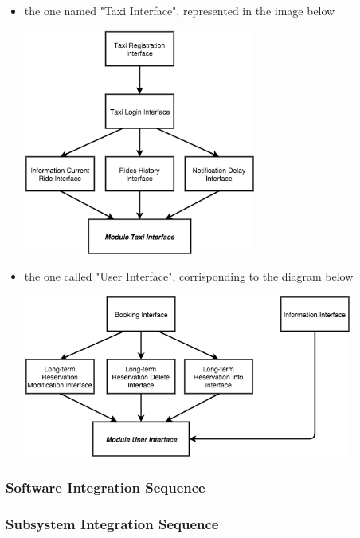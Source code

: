 	\begin{itemize}
		\item the one named "Taxi Interface", represented in the image below
		    \begin{center}
			    \includegraphics[width=0.60\textwidth]{./images/ModuleTaxiInterface.png}~\\[1.5cm] 
			\end{center}
		\item the one called "User Interface", corrisponding to the diagram below
		    \begin{center}
			    \includegraphics[width=0.85\textwidth]{./images/ModuleUserInterface.png}~\\[1.5cm] 
			\end{center}
	\end{itemize}
\subsubsection{Software Integration Sequence}
\subsubsection{Subsystem Integration Sequence}